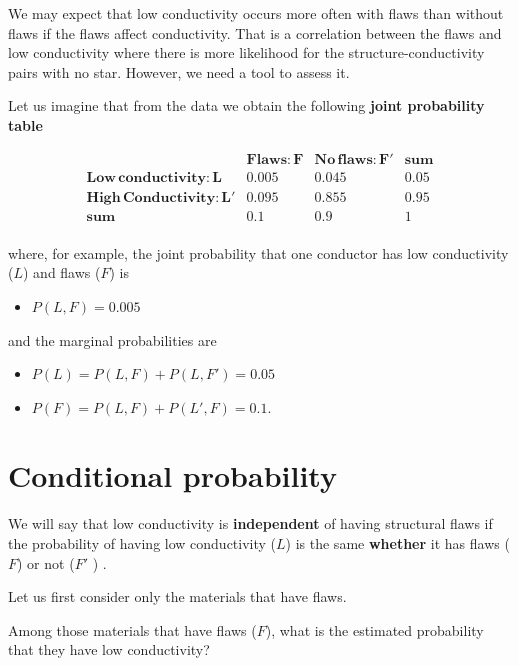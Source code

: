 \documentclass[
]{book}
\providecommand{\tightlist}{%
  \setlength{\itemsep}{0pt}\setlength{\parskip}{0pt}}
\begin{document}
We may expect that low conductivity occurs more often with flaws than without flaws if the flaws affect conductivity. That is a correlation between the flaws and low conductivity where there is more likelihood for the structure-conductivity pairs with no star. However, we need a tool to assess it.

Let us imagine that from the data we obtain the following \textbf{joint probability table}

\[
\begin{array}{ccc|c}
 & \mathbf{Flaws: F} & \mathbf{No\, flaws: F'} & \mathbf{sum} \\
\mathbf{Low\, conductivity: L} & 0.005 & 0.045 & 0.05 \\
\mathbf{High\, Conductivity: L'} & 0.095 & 0.855 & 0.95 \\ \hline
\mathbf{sum} & 0.1 & 0.9 & 1 \\
\end{array}
\]

where, for example, the joint probability that one conductor has low conductivity (\(L\)) and flaws (\(F\)) is

\begin{itemize}
\tightlist
\item
  \(P(L,F)=0.005\)
\end{itemize}

and the marginal probabilities are

\begin{itemize}
\tightlist
\item
  \(P(L)=P(L, F) + P(L, F')=0.05\)
\item
  \(P(F)=P(L, F) + P(L', F)= 0.1\).
\end{itemize}

\hypertarget{conditional-probability-1}{%
\section{Conditional probability}\label{conditional-probability-1}}

We will say that low conductivity is \textbf{independent} of having structural flaws if the probability of having low conductivity (\(L\)) is the same \textbf{whether} it has flaws (\(F\)) or not (\(F'\) ) .

Let us first consider only the materials that have flaws.

Among those materials that have flaws (\(F\)), what is the estimated probability that they have low conductivity?
\end{document}
